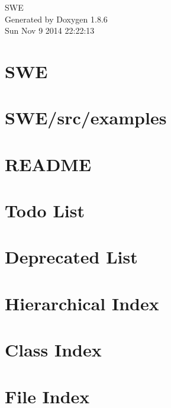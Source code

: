\documentclass[twoside]{book}
\newcommand{\clearemptydoublepage}{%
  \newpage{\pagestyle{empty}\cleardoublepage}%
}
\begin{document}
\begin{titlepage}
\vspace*{7cm}
\begin{center}%
{\Large S\-W\-E }\\
\vspace*{1cm}
{\large Generated by Doxygen 1.8.6}\\
\vspace*{0.5cm}
{\small Sun Nov 9 2014 22:22:13}\\
\end{center}
\end{titlepage}
\clearemptydoublepage
\tableofcontents
\clearemptydoublepage
{}

\chapter{S\-W\-E}
\label{md_README}

\chapter{S\-W\-E/src/examples}
\label{md_src_examples_README}

\chapter{R\-E\-A\-D\-M\-E}
\label{md_src_solvers_README}

\chapter{Todo List}
\label{todo}

\chapter{Deprecated List}
\label{deprecated}

\chapter{Hierarchical Index}

\chapter{Class Index}

\chapter{File Index}

\end{document}
